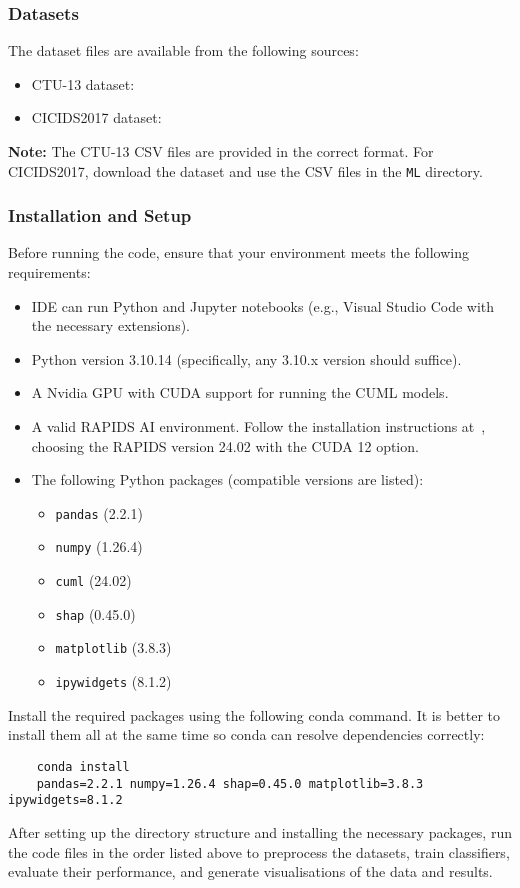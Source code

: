 \subsubsection{Datasets}

The dataset files are available from the following sources:

\begin{itemize}
    \item CTU-13 dataset:~\cite{CTU13download}
    \item CICIDS2017 dataset:~\cite{CICIDS2017download}
\end{itemize}

\textbf{Note:} The CTU-13 CSV files are provided in the correct format. For CICIDS2017, download the dataset and use the CSV files in the \texttt{ML} directory.

\subsubsection{Installation and Setup}

Before running the code, ensure that your environment meets the following requirements:

\begin{itemize}
    \item IDE can run Python and Jupyter notebooks (e.g., Visual Studio Code with the necessary extensions).
    \item Python version 3.10.14 (specifically, any 3.10.x version should suffice).
    \item A Nvidia GPU with CUDA support for running the CUML models.
    \item A valid RAPIDS AI environment. 
    Follow the installation instructions at~\cite{RAPIDSdownload}, choosing the RAPIDS version 24.02 with the CUDA 12 option.
    \item The following Python packages (compatible versions are listed):
    \begin{itemize}
        \item \texttt{pandas} (2.2.1)
        \item \texttt{numpy} (1.26.4)
        \item \texttt{cuml} (24.02)
        \item \texttt{shap} (0.45.0)
        \item \texttt{matplotlib} (3.8.3)
        \item \texttt{ipywidgets} (8.1.2)
    \end{itemize}
\end{itemize}

Install the required packages using the following conda command. It is better to install them all at the same time so conda can resolve dependencies correctly:

\begin{verbatim}
    conda install 
    pandas=2.2.1 numpy=1.26.4 shap=0.45.0 matplotlib=3.8.3 ipywidgets=8.1.2
\end{verbatim}

After setting up the directory structure and installing the necessary packages, run the code files in the order listed above to preprocess the datasets, train classifiers, evaluate their performance, and generate visualisations of the data and results.